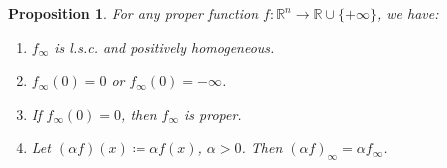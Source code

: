 \documentclass[a4paper,11pt, oneside]{book}
\newtheorem{prop}[thm]{Proposition}
\theoremstyle{definition}
\newcommand{\RealNumberSet}{\mathbb{R}}
\newcommand{\NDemenstionalRealEuclideanSpace}{\mathbb{R}^n}
\newcommand{\ExtendedRealValuedFunction}[2]{{#1}: {#2} \to \RealNumberSet \cup \{+\infty\}}
\begin{document}
\begin{prop}\label{basicPropositionOfAsymptoticFunctions}
  For any proper function $\ExtendedRealValuedFunction{f}{\NDemenstionalRealEuclideanSpace}$, we have:
  \begin{enumerate}[label=\roman*,align=CenterWithParen]
    \item $f_{\infty}$ is l.s.c. and positively homogeneous.
    \item $f_{\infty}(0) = 0$ or $f_{\infty}(0) = - \infty$.
    \item If $f_{\infty}(0) = 0$, then $f_{\infty}$ is proper.
    \item Let $(\alpha f)(x) \coloneqq \alpha f(x)$, $\alpha > 0$. Then $(\alpha f)_{\infty} = \alpha f_{\infty}$.
  \end{enumerate}
\end{prop}
\end{document}
